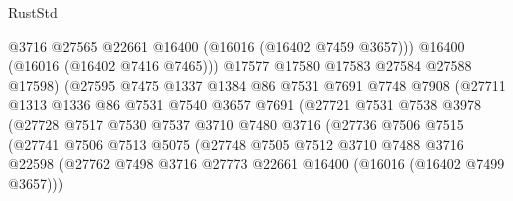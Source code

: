 \begin{lexlean}{RustStd}
\begin{coremodule}
                                  @3716
                                  @27565
                                  @22661
                                  @16400
                                  (@16016 (@16402 @7459 @3657)))
                                @16400
                                (@16016 (@16402 @7416 @7465)))
                              @17577
                              @17580
                              @17583
                              @27584
                              @27588
                              @17598)
                            (@27595
                              @7475
                              @1337
                              @1384
                              @86
                              @7531
                              @7691
                              @7748
                              @7908
                              (@27711
                                @1313
                                @1336
                                @86
                                @7531
                                @7540
                                @3657
                                @7691
                                (@27721
                                  @7531
                                  @7538
                                  @3978
                                  (@27728
                                    @7517
                                    @7530
                                    @7537
                                    @3710
                                    @7480
                                    @3716
                                    (@27736
                                      @7506
                                      @7515
                                      (@27741
                                        @7506
                                        @7513
                                        @5075
                                        (@27748
                                          @7505
                                          @7512
                                          @3710
                                          @7488
                                          @3716
                                          @22598
                                          (@27762
                                            @7498
                                            @3716
                                            @27773
                                            @22661
                                            @16400
                                            (@16016 (@16402 @7499 @3657)))

\end{coremodule}
\end{lexlean}
